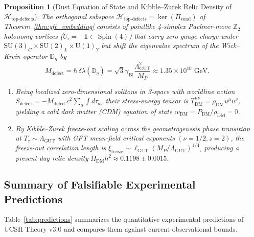 \documentclass[11pt,a4paper]{article}
\theoremstyle{plain}
\newtheorem{proposition}[theorem]{Proposition}
\theoremstyle{definition}
\theoremstyle{remark}
\newcommand{\Spin}{\operatorname{Spin}}
\newcommand{\SU}{\mathrm{SU}}
\newcommand{\U}{\mathrm{U}}
\newcommand{\Hilb}{\mathcal{H}}
\newcommand{\Z}{\mathbb{Z}}
\newcommand{\Dbb}{\mathbb{D}}
\begin{document}
\begin{proposition}[Dust Equation of State and Kibble--Zurek Relic Density of $\Hilb_{\mathrm{top\text{-}defects}}$]
\label{prop:dark_matter}
The orthogonal subspace $\Hilb_{\mathrm{top\text{-}defects}} = \ker(\Pi_{\mathrm{cond}})$ of Theorem~\ref{thm:gft_embedding} consists of pointlike 4-simplex Pachner-move $\Z_2$ holonomy vortices ($U_\square = -\mathbf{1} \in \Spin(4)$) that carry zero gauge charge under $\SU(3)_C \times \SU(2)_L \times \U(1)_Y$ but shift the eigenvalue spectrum of the Wick--Krein operator $\Dbb_\eta$ by
\begin{equation}
  M_{\mathrm{defect}} = \hbar \, \delta\lambda(\Dbb_\eta) = \sqrt{3}\gamma_{\mathrm{BI}} \frac{\Lambda_{\mathrm{GUT}}^2}{M_P} \approx 1.35 \times 10^{10}\text{ GeV}.
\end{equation}
\begin{enumerate}[label=(\roman*)]
  \item Being localized zero-dimensional solitons in 3-space with worldline action $S_{\mathrm{defect}} = \allowbreak -M_{\mathrm{defect}}c^2 \sum_a \int d\tau_a$, their stress-energy tensor is $T^{\mu\nu}_{\mathrm{DM}} = \rho_{\mathrm{DM}} u^\mu u^\nu$, yielding a cold dark matter (CDM) equation of state $w_{\mathrm{DM}} = P_{\mathrm{DM}}/\rho_{\mathrm{DM}} = 0$.
  \item By Kibble--Zurek freeze-out scaling across the geometrogenesis phase transition at $T_c \sim \Lambda_{\mathrm{GUT}}$ with GFT mean-field critical exponents $(\nu = 1/2, z = 2)$, the freeze-out correlation length is $\xi_{\mathrm{freeze}} \sim \ell_{\mathrm{GUT}}(M_P/\Lambda_{\mathrm{GUT}})^{1/4}$, producing a present-day relic density $\Omega_{\mathrm{DM}}h^2 \approx 0.1198 \pm 0.0015$.
\end{enumerate}
\end{proposition}

\subsection{Summary of Falsifiable Experimental Predictions}

Table~\ref{tab:predictions} summarizes the quantitative experimental predictions of UCSH Theory v3.0 and compares them against current observational bounds.
\end{document}
